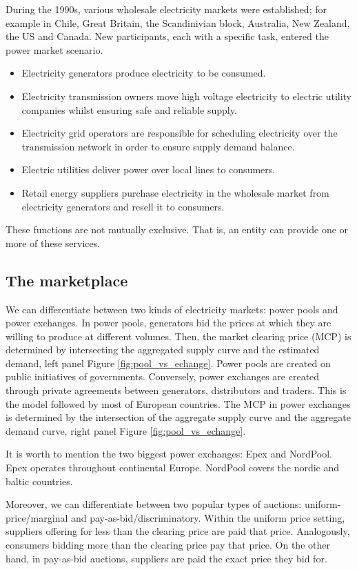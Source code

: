 During the 1990s, various wholesale electricity markets were established; for example in Chile, Great Britain, the Scandinivian block, Australia, New Zealand, the US and Canada. New participants, each with a specific task, entered the power market scenario.
\begin{itemize}
    \item Electricity generators produce electricity to be consumed.
    \item Electricity transmission owners 
    move high voltage electricity to electric utility companies whilst ensuring safe and reliable supply.
    \item Electricity grid operators are responsible for scheduling electricity over the transmission network in order to ensure supply demand balance.
    \item Electric utilities deliver power over local lines to consumers. 
    \item Retail energy suppliers purchase electricity in the wholesale market from electricity generators and resell it to consumers.
\end{itemize}
These functions are not mutually exclusive. That is, an entity can provide one or more of these services.


\subsection{The marketplace}
We can differentiate between two kinds of electricity markets: power pools and power exchanges. In power pools, generators bid the prices at which they are willing to produce at different volumes. Then, the market clearing price (MCP) is determined by intersecting the aggregated supply curve and the estimated demand, left panel Figure \ref{fig:pool_vs_echange}. Power pools are created on public initiatives of governments. Conversely, power exchanges are created through private agreements between generators, distributors and traders. This is the model followed by most of European countries.
The MCP in power exchanges is determined by the intersection of the aggregate supply curve and the aggregate demand curve, right panel Figure \ref{fig:pool_vs_echange}.

It is worth to mention the two biggest power exchanges: Epex and NordPool. Epex operates throughout continental Europe. NordPool covers the nordic and baltic countries.

Moreover, we can differentiate between two popular types of auctions: uniform-price/marginal and pay-as-bid/discriminatory. Within the uniform price setting, suppliers offering for less than the clearing price are paid that price. Analogously, consumers bidding more than the clearing price pay that price. On the other hand, in pay-as-bid auctions, suppliers are paid the exact price they bid for.


